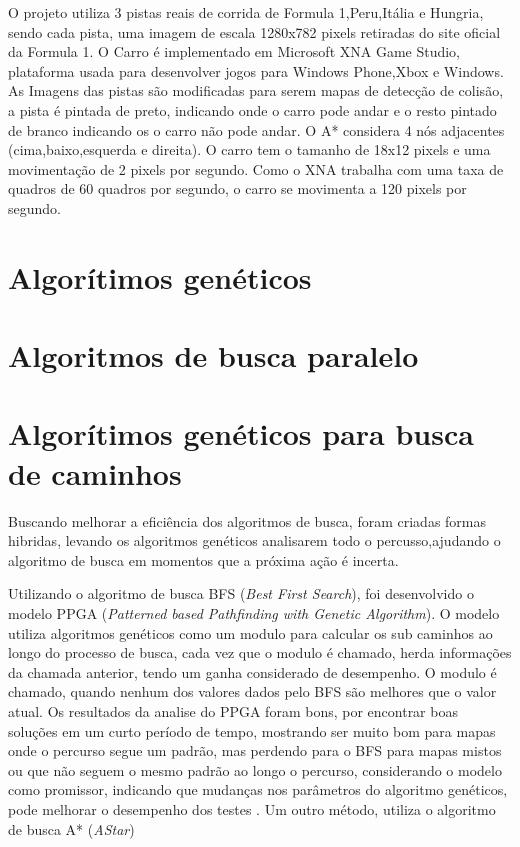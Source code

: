 O projeto utiliza 3 pistas reais de corrida de Formula 1,Peru,Itália e Hungria, sendo cada pista, uma imagem de escala 1280x782 pixels retiradas do site oficial da Formula 1. O Carro é implementado em Microsoft XNA Game Studio, plataforma usada para desenvolver jogos para Windows Phone,Xbox e Windows.
As Imagens das pistas são modificadas para serem mapas de detecção de colisão, a pista é pintada de preto, indicando onde o carro pode andar e o resto pintado de branco indicando os o carro não pode andar. O A* considera 4 nós adjacentes (cima,baixo,esquerda e direita). O carro tem o tamanho de 18x12 pixels e uma movimentação de 2 pixels por segundo. Como o XNA trabalha com uma taxa de quadros de 60 quadros por segundo, o carro se movimenta a 120 pixels por segundo.

\section{Algorítimos genéticos}

\section{Algoritmos de busca paralelo}

\section{Algorítimos genéticos para busca de caminhos}
Buscando melhorar a eficiência dos algoritmos de busca, foram criadas formas hibridas, levando os algoritmos genéticos analisarem todo o percusso,ajudando o algoritmo de busca em momentos que a próxima ação é incerta.

Utilizando o algoritmo de busca BFS (\textit{Best First Search}), foi desenvolvido o modelo PPGA (\textit{Patterned based Pathfinding with Genetic Algorithm}). O modelo utiliza algoritmos genéticos como um modulo para calcular os sub caminhos ao longo do processo de busca, cada vez que o modulo é chamado, herda informações da chamada anterior, tendo um ganha considerado de desempenho. O modulo é chamado, quando nenhum dos valores dados pelo BFS são melhores que o valor atual. Os resultados da analise do PPGA foram bons, por encontrar boas soluções em um curto período de tempo, mostrando ser muito bom para mapas onde o percurso segue um padrão, mas perdendo para o BFS para mapas mistos ou que não seguem o mesmo padrão ao longo o percurso, considerando o modelo como promissor, indicando que mudanças nos parâmetros do algoritmo genéticos, pode melhorar o desempenho dos testes \cite{Ulysses}.
Um outro método, utiliza o algoritmo de busca A* (\textit{AStar})

